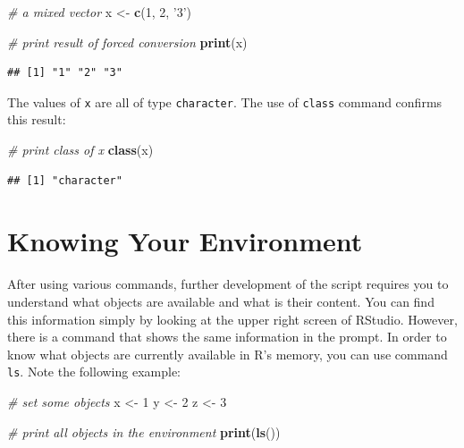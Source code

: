 \documentclass[11pt,]{book}
\newenvironment{Shaded}{\begin{snugshade}}{\end{snugshade}}
\newcommand{\KeywordTok}[1]{\textcolor[rgb]{0.27,0.27,0.27}{\textbf{#1}}}
\newcommand{\DecValTok}[1]{\textcolor[rgb]{0.06,0.06,0.06}{#1}}
\newcommand{\StringTok}[1]{\textcolor[rgb]{0.5,0.5,0.5}{#1}}
\newcommand{\CommentTok}[1]{\textcolor[rgb]{0.56,0.35,0.01}{\textit{#1}}}
\newcommand{\NormalTok}[1]{#1}
\begin{document}
\begin{Shaded}
\begin{Highlighting}[]
\CommentTok{# a mixed vector}
\NormalTok{x <-}\StringTok{ }\KeywordTok{c}\NormalTok{(}\DecValTok{1}\NormalTok{, }\DecValTok{2}\NormalTok{, }\StringTok{'3'}\NormalTok{)}

\CommentTok{# print result of forced conversion}
\KeywordTok{print}\NormalTok{(x)}
\end{Highlighting}
\end{Shaded}

\begin{verbatim}
## [1] "1" "2" "3"
\end{verbatim}

The values of \texttt{x} are all of type \texttt{character}. The use of
\texttt{class} command confirms this result:

\begin{Shaded}
\begin{Highlighting}[]
\CommentTok{# print class of x}
\KeywordTok{class}\NormalTok{(x)}
\end{Highlighting}
\end{Shaded}

\begin{verbatim}
## [1] "character"
\end{verbatim}

\section{Knowing Your Environment}\label{knowing-your-environment}

After using various commands, further development of the script requires
you to understand what objects are available and what is their content.
You can find this information simply by looking at the upper right
screen of RStudio. However, there is a command that shows the same
information in the prompt. In order to know what objects are currently
available in R's memory, you can use command \texttt{ls}. Note the
following example: 

\begin{Shaded}
\begin{Highlighting}[]
\CommentTok{# set some objects}
\NormalTok{x <-}\StringTok{ }\DecValTok{1}
\NormalTok{y <-}\StringTok{ }\DecValTok{2}
\NormalTok{z <-}\StringTok{ }\DecValTok{3}

\CommentTok{# print all objects in the environment}
\KeywordTok{print}\NormalTok{(}\KeywordTok{ls}\NormalTok{())}
\end{Highlighting}
\end{Shaded}
\end{document}
